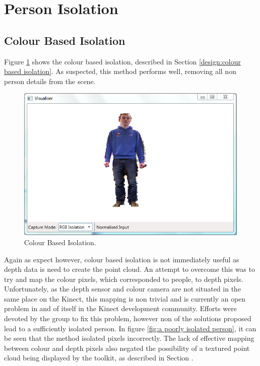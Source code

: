 \section{Person Isolation}
\label{testing:person isolation}

\subsection{Colour Based Isolation}
\label{testing:colour based isolation}
Figure \ref{fig:colour based cut off} shows the colour based isolation, described in Section \ref{design:colour based isolation}.
As suspected, this method performs well, removing all non person  details from the scene.\\

\begin{figure}[h]
\begin{center}
\includegraphics[scale=0.8]{./testing/parse4} 
\end{center}
\caption{Colour Based Isolation.}
\label{fig:colour based cut off}
\end{figure} 

Again as expect however, colour based isolation is not immediately useful as depth data is need to create the point cloud. An attempt to overcome this was to try and map the colour pixels, which corresponded to people, to depth pixels.
Unfortunately, as the depth sensor and colour camera are not situated in the same place on the Kinect, this mapping is non trivial and is currently an open problem in and of itself in the Kinect development community.
Efforts were devoted by the group to fix this problem, however non of the solutions proposed lead to a sufficiently isolated person.
In figure \ref{fig:a poorly isolated person}, it can be seen that the method isolated pixels incorrectly. 
The lack of effective mapping between colour and depth pixels also negated the possibility of a textured point cloud being displayed by the toolkit, as described in Section .

